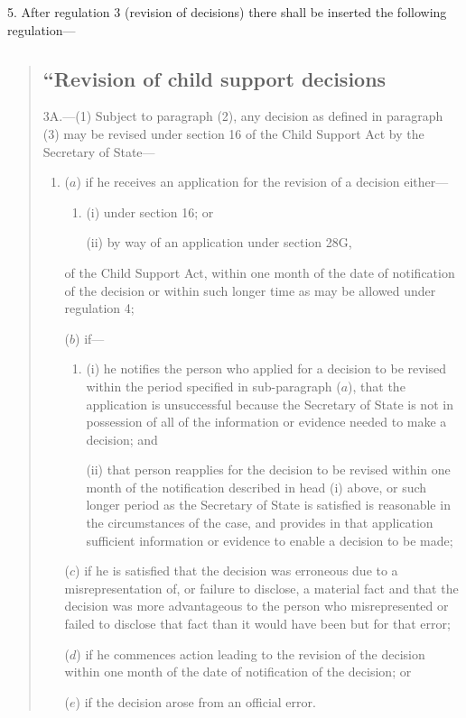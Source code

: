 \documentclass[12pt,a4paper]{article}
\begin{document}
5.  After regulation 3 (revision of decisions) there shall be inserted the following regulation—
\begin{quotation}
\subsection*{“Revision of child support decisions}

3A.---(1)  Subject to paragraph (2), any decision as defined in paragraph (3) may be revised under section 16 of the Child Support Act by the Secretary of State—
\begin{enumerate}\item[]
($a$) if he receives an application for the revision of a decision either—
\begin{enumerate}\item[]
(i) under section 16; or

(ii) by way of an application under section 28G,
\end{enumerate}
of the Child Support Act, within one month of the date of notification of the decision or within such longer time as may be allowed under regulation 4;

($b$) if—
\begin{enumerate}\item[]
(i) he notifies the person who applied for a decision to be revised within the period specified in sub-paragraph ($a$), that the application is unsuccessful because the Secretary of State is not in possession of all of the information or evidence needed to make a decision; and

(ii) that person reapplies for the decision to be revised within one month of the notification described in head (i)  above, or such longer period as the Secretary of State is satisfied is reasonable in the circumstances of the case, and provides in that application sufficient information or evidence to enable a decision to be made;
\end{enumerate}

($c$) if he is satisfied that the decision was erroneous due to a misrepresentation of, or failure to disclose, a material fact and that the decision was more advantageous to the person who misrepresented or failed to disclose that fact than it would have been but for that error;

($d$) if he commences action leading to the revision of the decision within one month of the date of notification of the decision; or

($e$) if the decision arose from an official error.
\end{enumerate}


\end{quotation}
\end{document}
